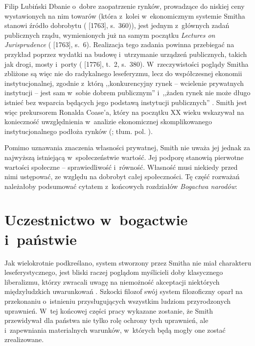 \begin{artplenv}{Filip Lubiński}
Dbanie o~dobre zaopatrzenie rynków, prowadzące do niskiej ceny wystawionych na nim towarów
(która z~kolei w~ekonomicznym systemie Smitha stanowi źródło dobrobytu
(\cite{smith_lectures_1982} [1763], s.~360)),
jest
jednym z~głównych zadań publicznych rządu, wymienionych już na samym początku \textit{Lectures on Jurisprudence}
(\cite{smith_lectures_1982} [1763], s.~6).
Realizacja tego zadania powinna przebiegać na przykład poprzez
wydatki na budowę i~utrzymanie urządzeń publicznych, takich jak drogi, mosty i~porty
(\cite{smith_badania_2007} [1776], t.~2, s.~380).
W~rzeczywistości poglądy Smitha zbliżone są więc nie do radykalnego leseferyzmu, lecz do
współczesnej ekonomii instytucjonalnej, zgodnie z~którą ,,konkurencyjny rynek -- wcielenie prywatnych instytucji -- jest
sam w~sobie dobrem publicznym'' i~,,żaden rynek nie może długo istnieć bez wsparcia będących jego podstawą instytucji
publicznych''
\parencite[s.~20]{ostrom_dysponowanie_2013}.
Smith jest więc prekursorem Ronalda Coase'a, który na
początku XX wieku wskazywał na konieczność uwzględnienia w~analizie ekonomicznej skomplikowanego instytucjonalnego
podłoża rynków
(\cite[s.~8]{coase_firm_1990}; tłum. pol. \cite*{coase_firma_2013}).

Pomimo uznawania znaczenia własności prywatnej, Smith nie uważa jej jednak za najwyższą istniejącą w~społeczeństwie
wartość. Jej podporę stanowią pierwotne wartości społeczne -- sprawiedliwość i~równość. Własność musi niekiedy przed
nimi ustępować, ze względu na dobrobyt całej społeczności. Tę część rozważań należałoby podsumować cytatem z~końcowych
rozdziałów \textit{Bogactwa narodów}:

\section{Uczestnictwo w~bogactwie i~państwie}
Jak wielokrotnie podkreślano, system stworzony przez Smitha nie miał charakteru leseferystycznego,
jest bliski raczej poglądom myślicieli doby klasycznego liberalizmu, którzy zwracali uwagę na niemożność akceptacji
niektórych międzyludzkich uwarunkowań
\parencite[s.~215]{rawls_wyklady_2010}.
Szkocki filozof swój system
filozoficzny oparł na przekonaniu o~istnieniu przysługujących wszystkim ludziom przyrodzonych uprawnień. W~tej końcowej
części pracy wykazane zostanie, że Smith przewidywał dla państwa nie tylko rolę ochrony tych uprawnień,
ale i~zapewniania materialnych warunków, w~których będą mogły one zostać zrealizowane.


\end{artplenv}
